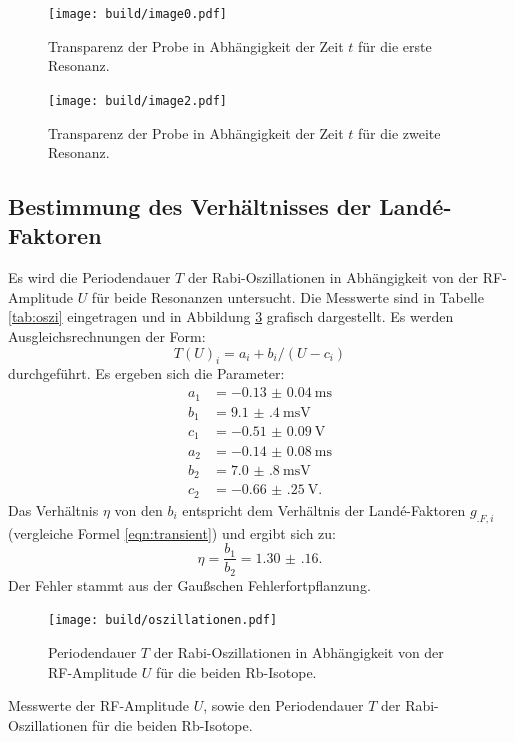 \begin{figure}
	\centering
	\texttt{[image: build/image0.pdf]}
	\caption{Transparenz der Probe in Abhängigkeit der Zeit $t$ für die erste Resonanz.}
	\label{fig:messung2a}
\end{figure}

\begin{figure}
	\centering
	\texttt{[image: build/image2.pdf]}
	\caption{Transparenz der Probe in Abhängigkeit der Zeit $t$ für die zweite Resonanz.}
	\label{fig:messung2b}
\end{figure}

\subsection{Bestimmung des Verhältnisses der Landé-Faktoren}

Es wird die Periodendauer $T$ der Rabi-Oszillationen in Abhängigkeit von der RF-Amplitude $U$ für beide Resonanzen untersucht. Die Messwerte sind in Tabelle \ref{tab:oszi} eingetragen und in Abbildung \ref{fig:oszi} grafisch dargestellt.
Es werden Ausgleichsrechnungen der Form:
\[
T(U)_i = a_i+b_i/(U-c_i)
\] 
durchgeführt. Es ergeben sich die Parameter:
\begin{align*}
a_1 &= \SI{-0.13(4)}{\milli\second}\\
b_1 &= \SI{9.1(4)}{\milli\second\volt}\\
c_1 &= \SI{-0.51(9)}{\volt}\\
a_2 &= \SI{-0.14(8)}{\milli\second}\\
b_2 &= \SI{7.0(8)}{\milli\second\volt}\\
c_2 &= \SI{-0.66(25)}{\volt}\text{.}
\end{align*}
Das Verhältnis $\eta$ von den $b_i$ entspricht dem Verhältnis der Landé-Faktoren $g_{.F,i}$ (vergleiche Formel \eqref{eqn:transient}) und ergibt sich zu:
\[
\eta = \frac{b_1}{b_2}=\num{1.30(16)}\text{.}
\]
Der Fehler stammt aus der Gaußschen Fehlerfortpflanzung.

\begin{figure}
	\centering
	\texttt{[image: build/oszillationen.pdf]}
	\caption{Periodendauer $T$ der Rabi-Oszillationen in Abhängigkeit von der RF-Amplitude $U$ für die beiden Rb-Isotope.}
	\label{fig:oszi}
\end{figure}

\begin{table}
	\centering
	\caption{Messwerte der RF-Amplitude $U$, sowie den Periodendauer $T$ der Rabi-Oszillationen für die beiden Rb-Isotope.}
	
	\label{tab:oszi}
\end{table}